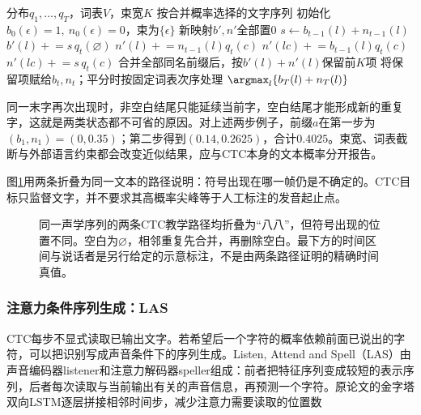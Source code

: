 \begin{algorithm}[CTC前缀的空白与非空白合并]
  \label{alg:nlp-speech-prefix}
  \begin{algorithmic}[1]
    \Require 分布$q_1,\ldots,q_T$，词表$V$，束宽$K$
    \Ensure 按合并概率选择的文字序列
    \State 初始化$b_0(\epsilon)=1,\ n_0(\epsilon)=0$，束为$\{\epsilon\}$
      \State 新映射$b',n'$全部置0
        \State $s\gets b_{t-1}(l)+n_{t-1}(l)$
        \State $b'(l)\mathrel{+}=s\,q_t(\varnothing)$
            \State $n'(l)\mathrel{+}=n_{t-1}(l)q_t(c)$
            \State $n'(lc)\mathrel{+}=b_{t-1}(l)q_t(c)$
          \Else
            \State $n'(lc)\mathrel{+}=s\,q_t(c)$
          \EndIf
        \EndFor
      \EndFor
      \State 合并全部同名前缀后，按$b'(l)+n'(l)$保留前$K$项
      \State 将保留项赋给$b_t,n_t$；平分时按固定词表次序处理
    \EndFor
    \State \Return $\argmax_l\{b_T(l)+n_T(l)\}$
  \end{algorithmic}
\end{algorithm}

同一末字再次出现时，非空白结尾只能延续当前字，空白结尾才能形成新的重复字，这就是两类状态都不可省的原因。对上述两步例子，前缀$a$在第一步为$(b_1,n_1)=(0,0.35)$；第二步得到$(0.14,0.2625)$，合计$0.4025$。束宽、词表截断与外部语言约束都会改变近似结果，应与CTC本身的文本概率分开报告。

图\ref{fig:nlp-speech-alignment}用两条折叠为同一文本的路径说明：符号出现在哪一帧仍是不确定的。CTC目标只监督文字，并不要求其高概率尖峰等于人工标注的发音起止点。

\begin{figure}[htbp]
  \centering
  
  \caption{同一声学序列的两条CTC教学路径均折叠为“八八”，但符号出现的位置不同。空白为$\varnothing$，相邻重复先合并，再删除空白。最下方的时间区间与说话者是另行给定的示意标注，不是由两条路径证明的精确时间真值。}
  \label{fig:nlp-speech-alignment}
\end{figure}
\FloatBarrier

\subsubsection{注意力条件序列生成：LAS}
\label{sec:nlp-speech-las}

CTC每步不显式读取已输出文字。若希望后一个字符的概率依赖前面已说出的字符，可以把识别写成声音条件下的序列生成。Listen, Attend and Spell（LAS）由声音编码器listener和注意力解码器speller组成：前者把特征序列变成较短的表示序列，后者每次读取与当前输出有关的声音信息，再预测一个字符。原论文的金字塔双向LSTM逐层拼接相邻时间步，减少注意力需要读取的位置数

